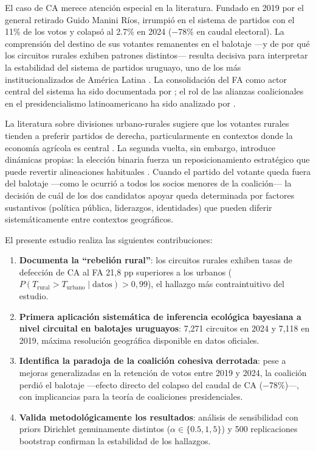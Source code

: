 El caso de CA merece atención especial en la literatura. Fundado en 2019 por el general retirado Guido Manini Ríos, irrumpió en el sistema de partidos con el 11\% de los votos y colapsó al 2.7\% en 2024 ($-$78\% en caudal electoral). La comprensión del destino de sus votantes remanentes en el balotaje ---y de por qué los circuitos rurales exhiben patrones distintos--- resulta decisiva para interpretar la estabilidad del sistema de partidos uruguayo, uno de los más institucionalizados de América Latina \citep{mainwaring1995party, sartori1976parties}. La consolidación del FA como actor central del sistema ha sido documentada por \citet{perezbentancur2019frente}; el rol de las alianzas coalicionales en el presidencialismo latinoamericano ha sido analizado por \citet{chasquetti2004democracia}.

La literatura sobre divisiones urbano-rurales sugiere que los votantes rurales tienden a preferir partidos de derecha, particularmente en contextos donde la economía agrícola es central \citep{rodden2019s, gonzalez1991electoral}. La segunda vuelta, sin embargo, introduce dinámicas propias: la elección binaria fuerza un reposicionamiento estratégico que puede revertir alineaciones habituales \citep{birch2003tworound}. Cuando el partido del votante queda fuera del balotaje ---como le ocurrió a todos los socios menores de la coalición--- la decisión de cuál de los dos candidatos apoyar queda determinada por factores sustantivos (política pública, liderazgos, identidades) que pueden diferir sistemáticamente entre contextos geográficos.

El presente estudio realiza las siguientes contribuciones:

\begin{enumerate}
    \item \textbf{Documenta la ``rebelión rural''}: los circuitos rurales exhiben tasas de defección de CA al FA 21{,}8 pp superiores a los urbanos ($P(T_{\text{rural}} > T_{\text{urbano}} \mid \text{datos}) > 0{,}99$), el hallazgo más contraintuitivo del estudio.

    \item \textbf{Primera aplicación sistemática de inferencia ecológica bayesiana a nivel circuital en balotajes uruguayos}: 7{,}271 circuitos en 2024 y 7{,}118 en 2019, máxima resolución geográfica disponible en datos oficiales.

    \item \textbf{Identifica la paradoja de la coalición cohesiva derrotada}: pese a mejoras generalizadas en la retención de votos entre 2019 y 2024, la coalición perdió el balotaje ---efecto directo del colapso del caudal de CA ($-$78\%)---, con implicancias para la teoría de coaliciones presidenciales.

    \item \textbf{Valida metodológicamente los resultados}: análisis de sensibilidad con priors Dirichlet genuinamente distintos ($\alpha \in \{0.5, 1, 5\}$) y 500 replicaciones bootstrap confirman la estabilidad de los hallazgos.
\end{enumerate}

